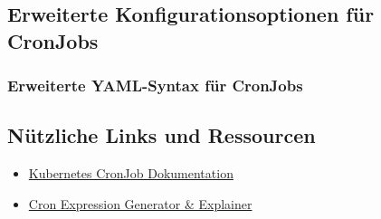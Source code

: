 \subsection{Erweiterte Konfigurationsoptionen für CronJobs}
\subsubsection{Erweiterte YAML-Syntax für CronJobs}


\subsection{Nützliche Links und Ressourcen}
\begin{itemize}
    \item \href{https://kubernetes.io/docs/concepts/workloads/controllers/cron-jobs/}{Kubernetes CronJob Dokumentation}
    \item \href{https://crontab.guru/}{Cron Expression Generator \& Explainer}
\end{itemize}